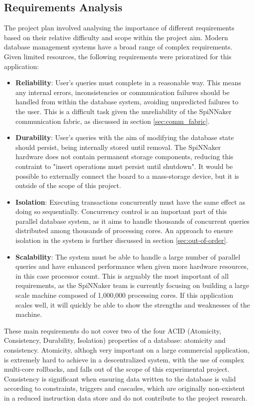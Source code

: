 \subsection{Requirements Analysis}
The project plan involved analysing the importance of different requirements based on their relative difficulty and scope within the project aim. Modern database management systems have a broad range of complex requirements. Given limited resources, the following requirements were prioratized for this application:

\begin{itemize}
	\item \textbf{Reliability}: User's queries must complete in a reasonable way. This means any internal errors, inconsistencies or communication failures should be handled from within the database system, avoiding unpredicted failures to the user. This is a difficult task given the unreliability of the SpiNNaker communication fabric, as discussed in section \ref{sec:comm_fabric}.
	\item \textbf{Durability}: User's queries with the aim of modifying the database state should persist, being internally stored until removal. The SpiNNaker hardware does not contain permanent storage components, reducing this contraint to "insert operations must persist until shutdown". It would be possible to externally connect the board to a mass-storage device, but it is outside of the scope of this project.
	\item \textbf{Isolation}: Executing transactions concurrently must have the same effect as doing so sequentially. Concurrency control is an important part of this parallel database system, as it aims to handle thousands of concurrent queries distributed among thousands of processing cores. An approach to ensure isolation in the system is further discussed in section \ref{sec:out-of-order}.
	\item \textbf{Scalability}: The system must be able to handle a large number of parallel queries and have enhanced performance when given more hardware resources, in this case processor count.	This is arguably the most important of all requirements, as the SpiNNaker team is currently focusing on building a large scale machine composed of 1,000,000 processing cores. If this application scales well, it will quickly be able to show the strengths and weaknesses of the machine.
\end{itemize}

These main requirements do not cover two of the four ACID (Atomicity, Consistency, Durability, Isolation) properties of a database: atomicity and consistency. Atomicity, althogh very important on a large commercial application, is extremely hard to achieve in a descentralized system, with the use of complex multi-core rollbacks, and falls out of the scope of this experimental project. Consistency is significant when ensuring data written to the database is valid according to constraints, triggers and cascades, which are originally non-existent in a reduced instruction data store and do not contribute to the project research.

